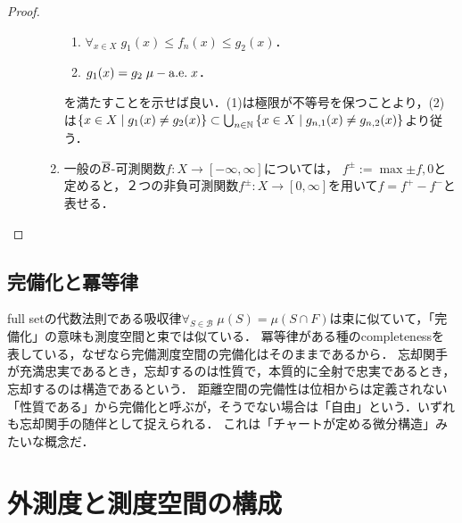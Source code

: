 \documentclass[uplatex, dvipdfmx]{jsreport}
\renewcommand{\B}{\mathcal{B}}
\begin{document}
\begin{proof}
\begin{description}
\begin{enumerate}
\begin{enumerate}
                \item $\forall_{x\in X}\;g_{1}(x)\le f_n(x)\le g_{2}(x)$．
                \item $g_{1}(x)=g_{2}\;\mu-\mathrm{a.e.}\; x$．
            \end{enumerate}
            を満たすことを示せば良い．(1)は極限が不等号を保つことより，(2)は$\{x\in X\mid g_1(x)\ne g_2(x)\}\subset\bigcup_{n\in\mathbb{N}}\left\{x\in X\mid g_{n,1}(x)\ne g_{n,2}(x)\right\}$より従う．
            \item 一般の$\o{\B}$-可測関数$f:X\to[-\infty,\infty]$については，
            $f^{\pm}:=\max{\pm f,0}$と定めると，２つの非負可測関数$f^\pm:X\to[0,\infty]$を用いて$f=f^+-f^-$と表せる．
        \end{enumerate}
    \end{description}
\end{proof}

\subsection{完備化と冪等律}

\begin{tcolorbox}[colframe=ForestGreen, colback=ForestGreen!10!white,breakable,colbacktitle=ForestGreen!40!white,coltitle=black,fonttitle=\bfseries\sffamily,
title=]
    full setの代数法則である吸収律$\forall_{S\in\B}\;\mu(S)=\mu(S\cap F)$は束に似ていて，「完備化」の意味も測度空間と束では似ている．
    冪等律がある種のcompletenessを表している，なぜなら完備測度空間の完備化はそのままであるから．
    忘却関手が充満忠実であるとき，忘却するのは性質で，本質的に全射で忠実であるとき，忘却するのは構造であるという．
    距離空間の完備性は位相からは定義されない「性質である」から完備化と呼ぶが，そうでない場合は「自由」という．いずれも忘却関手の随伴として捉えられる．
    これは「チャートが定める微分構造」みたいな概念だ．
\end{tcolorbox}

\section{外測度と測度空間の構成}

    
\end{document}
